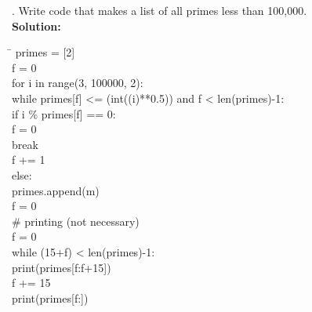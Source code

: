 \documentclass{article}
\newenvironment{code}{\begin{tcolorbox}\ttfamily}{\end{tcolorbox}}
\begin{document}
. Write code that makes a list of all primes less than 100,000.\\
\noindent \textbf{Solution:}
\begin{code}
\begin{tabbing}
	\hspace{5 cm} \= \hspace{5 cm} \kill
	primes = [2]\\
	f = 0\\
	for i in range(3, 100000, 2):\\
	    \hspace{2 em}while primes[f] <= (int((i)**0.5)) and f < len(primes)-1:\\
		\hspace{4 em}if i \% primes[f] == 0:\\
		    \hspace{6 em}f = 0\\
	            \hspace{6 em}break\\
		\hspace{4 em}f += 1\\
	    \hspace{2 em}else:\\
	        \hspace{4 em}primes.append(m)\\
	        \hspace{4 em}f = 0\\
	\# printing (not necessary)\\
	f = 0\\
	while (15+f) < len(primes)-1:\\
	    \hspace{2 em}print(primes[f:f+15])\\
	    \hspace{2 em}f += 15\\
	print(primes[f:])
\end{tabbing}
\end{code}
\end{document}
